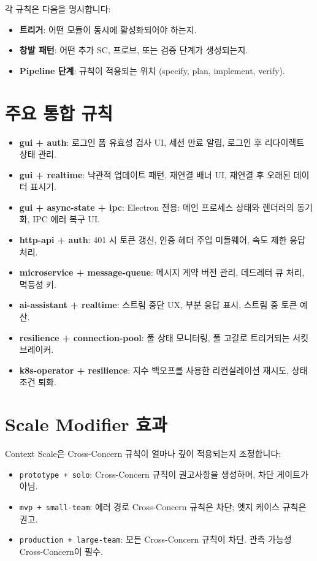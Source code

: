 \documentclass[11pt,a4paper,openright,twoside]{report}
\begin{document}
각 규칙은 다음을 명시합니다:
\begin{itemize}
  \item \textbf{트리거}: 어떤 모듈이 동시에 활성화되어야 하는지.
  \item \textbf{창발 패턴}: 어떤 추가 SC, 프로브, 또는 검증 단계가 생성되는지.
  \item \textbf{Pipeline 단계}: 규칙이 적용되는 위치 (specify, plan, implement, verify).
\end{itemize}

\section{주요 통합 규칙}

\begin{itemize}
  \item \textbf{gui + auth}: 로그인 폼 유효성 검사 UI, 세션 만료 알림, 로그인 후 리다이렉트 상태 관리.
  \item \textbf{gui + realtime}: 낙관적 업데이트 패턴, 재연결 배너 UI, 재연결 후 오래된 데이터 표시기.
  \item \textbf{gui + async-state + ipc}: Electron 전용: 메인 프로세스 상태와 렌더러의 동기화, IPC 에러 복구 UI.
  \item \textbf{http-api + auth}: 401 시 토큰 갱신, 인증 헤더 주입 미들웨어, 속도 제한 응답 처리.
  \item \textbf{microservice + message-queue}: 메시지 계약 버전 관리, 데드레터 큐 처리, 멱등성 키.
  \item \textbf{ai-assistant + realtime}: 스트림 중단 UX, 부분 응답 표시, 스트림 중 토큰 예산.
  \item \textbf{resilience + connection-pool}: 풀 상태 모니터링, 풀 고갈로 트리거되는 서킷 브레이커.
  \item \textbf{k8s-operator + resilience}: 지수 백오프를 사용한 리컨실레이션 재시도, 상태 조건 퇴화.
\end{itemize}

\section{Scale Modifier 효과}

Context Scale은 Cross-Concern 규칙이 얼마나 깊이 적용되는지 조정합니다:

\begin{itemize}
  \item \texttt{prototype + solo}: Cross-Concern 규칙이 권고사항을 생성하며, 차단 게이트가 아님.
  \item \texttt{mvp + small-team}: 에러 경로 Cross-Concern 규칙은 차단; 엣지 케이스 규칙은 권고.
  \item \texttt{production + large-team}: 모든 Cross-Concern 규칙이 차단. 관측 가능성 Cross-Concern이 필수.
\end{itemize}
\end{document}
